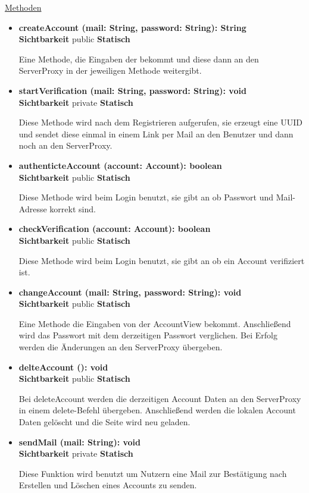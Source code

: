\underline{Methoden}
\begin{itemize}
\itemsep0pt
\item \textbf{createAccount (mail: String, password: String): String}\hfill\\
\textbf{Sichtbarkeit} public \newline
\textbf{Statisch}

Eine Methode, die Eingaben der  bekommt und diese dann an den ServerProxy in der jeweiligen Methode weitergibt.

\item \textbf{startVerification (mail: String, password: String): void}\hfill\\
\textbf{Sichtbarkeit} private \newline
\textbf{Statisch}

Diese Methode wird nach dem Registrieren aufgerufen, sie erzeugt eine UUID und sendet diese einmal in einem Link per Mail an den Benutzer und dann noch an den ServerProxy.

\item \textbf{authenticteAccount (account: Account): boolean}\hfill\\
\textbf{Sichtbarkeit} public \newline
\textbf{Statisch}

Diese Methode wird beim Login benutzt, sie gibt an ob Passwort und Mail-Adresse korrekt sind.

\item \textbf{checkVerification (account: Account): boolean}\hfill\\
\textbf{Sichtbarkeit} public \newline
\textbf{Statisch}

Diese Methode wird beim Login benutzt, sie gibt an ob ein Account verifiziert ist.

\item \textbf{changeAccount (mail: String, password: String): void}\hfill\\
\textbf{Sichtbarkeit} public \newline
\textbf{Statisch}

Eine Methode die Eingaben von der AccountView bekommt. Anschließend wird das Passwort mit dem derzeitigen Passwort verglichen. Bei Erfolg werden die Änderungen an den ServerProxy übergeben.

\item \textbf{delteAccount (): void}\hfill\\
\textbf{Sichtbarkeit} public \newline
\textbf{Statisch}

Bei deleteAccount werden die derzeitigen Account Daten an den ServerProxy in einem delete-Befehl übergeben. Anschließend werden die lokalen Account Daten gelöscht und die Seite wird neu geladen.

\item \textbf{sendMail (mail: String): void}\hfill\\
\textbf{Sichtbarkeit} private \newline
\textbf{Statisch}

Diese Funktion wird benutzt um Nutzern eine Mail zur Bestätigung nach Erstellen und Löschen eines Accounts zu senden.
\end{itemize}

